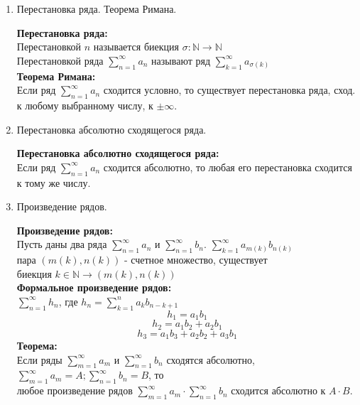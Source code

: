\documentclass[a4paper, 12pt]{article}
\begin{document}
\begin{enumerate}
\begin{mdframed}
		      Всякий ряд Лейбница сходится (вообще говоря, условно) и его остаток по модулю не превосходит модуля первого отброшенного члена.
	      \end{mdframed}
	\item Перестановка ряда. Теорема Римана. \\
	      \begin{mdframed}
		      \textbf{Перестановка ряда:} \\
		      Перестановкой $n$ называется биекция $\sigma: \mathbb{N} \to \mathbb{N}$ \\
		      Перестановкой ряда $\sum_{n=1}^{\infty} a_n$ называют ряд $\sum_{k=1}^{\infty} a_{\sigma(k)}$ \\
		      \textbf{Теорема Римана:} \\
		      Если ряд $\sum_{n=1}^{\infty} a_n$ сходится условно, то существует перестановка ряда, сход. к любому выбранному числу,  к $\pm \infty$.
	      \end{mdframed}
	\item Перестановка абсолютно сходящегося ряда. \\
	      \begin{mdframed}
		      \textbf{Перестановка абсолютно сходящегося ряда:} \\
		      Если ряд $\sum_{n=1}^{\infty} a_n$ сходится абсолютно, то любая его перестановка сходится к тому же числу.
	      \end{mdframed}
	\item Произведение рядов. \\
	      \begin{mdframed}
		      \textbf{Произведение рядов:} \\
		      Пусть даны два ряда $\sum_{n=1}^{\infty} a_n$ и $\sum_{n=1}^{\infty} b_n$.  $\sum_{k=1}^{\infty} a_{m(k)}b_{n(k)}$ \\
		      пара $(m(k), n(k))$ - счетное множество, существует \\ биекция $k \in \mathbb{N} \to (m(k), n(k))$  \\
		      \textbf{Формальное произведение рядов:} \\
		      $\sum_{n=1}^{\infty} h_n$, где $h_n = \sum_{k=1}^{n} a_kb_{n-k+1}$
		      \[
			      h_1 = a_1b_1
		      \]
		      \[
			      h_2 = a_1b_2 + a_2b_1
		      \]
		      \[
			      h_3 = a_1b_3 + a_2b_2 + a_3b_1
		      \]
		      \textbf{Теорема:} \\
		      Если ряды $\sum_{m=1}^{\infty} a_m$ и $\sum_{n=1}^{\infty} b_n$ сходятся абсолютно, \\
		      $\sum_{m=1}^{\infty} a_m = A; \sum_{n=1}^{\infty} b_n = B$, то \\ 
		      любое произведение рядов $\sum_{m=1}^{\infty} a_m \cdot \sum_{n=1}^{\infty} b_n$ сходится абсолютно к $A \cdot B$.


\end{mdframed}
\end{enumerate}
\end{document}
